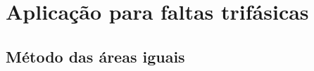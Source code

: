 \section{Aplicação para faltas trifásicas}

\lipsum[1]

\subsection{Método das áreas iguais}
\lipsum[1]


\pagebreak


